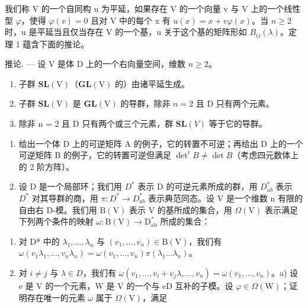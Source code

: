 我们称 V 的一个自同构 u 为平延，如果存在 V 的一个向量 v 与 V 上的一个线性型 \(\varphi\)，使得 \(\varphi(v)=0\) 且对 V 中的每个 x 有 \(u(x)=x+v\varphi(x)\)。当 \(n\geqslant2\) 时，u 是平延当且仅当存在 V 的一个基，u 关于这个基的矩阵形如 \(B_{ij}(\lambda)\)。定理 1 蕴含下面的推论。

推论. --- 设 V 是体 D 上的一个右向量空间，维数 \(n \geqslant 2\)。

\begin{enumerate}
\def\labelenumi{\alph{enumi})}
\item
  子群 \(\mathbf{SL}(\mathrm{V})\)（\(\mathbf{GL}(\mathrm{V})\) 的）由诸平延生成。
\item
  子群 \(\mathbf{SL}(\mathrm{V})\) 是 \(\mathbf{GL}(\mathrm{V})\) 的导群，除非 \(n = 2\) 且 D 只有两个元素。
\item
  除非 n = 2 且 D 只有两个或三个元素，群 \(\mathbf{SL}(V)\) 等于它的导群。
\end{enumerate}


\begin{enumerate}
\def\labelenumi{\arabic{enumi})}
\item
  给出一个体 D 上的可逆矩阵 A 的例子，它的转置不可逆；再给出 D 上的一个可逆矩阵 B 的例子，它的转置可逆但满足 \(\det^{t}B \neq \det B\)（考虑四元数体上的 2 阶方阵）。
\item
  设 D 是一个局部环；我们用 \(D^{*}\) 表示 D 的可逆元素所成的群，用 \(D_{ab}^{*}\) 表示 \(D^{*}\) 对其导群的商，用 \(\pi : D^{*} \to D_{ab}^{*}\) 表示典范同态。设 V 是一个维数 n 有限的自由右 D-模。我们用 \(\mathrm{B(V)}\) 表示 V 的基所成的集合，用 \(\Omega(\mathrm{V})\) 表示满足下列两个条件的映射 \(\omega : \mathrm{B(V)} \to \mathrm{D}_{\mathrm{ab}}^{*}\) 所成的集合：
\end{enumerate}

\begin{enumerate}
\def\labelenumi{(\roman{enumi})}
\item
  对 D* 中的 \(\lambda_1, \ldots, \lambda_n\) 与 \((v_1, \ldots, v_n) \in \mathrm{B}(\mathrm{V})\)，我们有 \(\omega(v_1 \lambda_1, \ldots, v_n \lambda_n) = \omega(v_1, \ldots, v_n)\pi(\lambda_1 \ldots \lambda_n)\)。
\item
  对 \(i \neq j\) 与 \(\lambda \in D\)，我们有 \(\omega(v_{1},\ldots,v_{i}+v_{j}\lambda,\ldots,v_{n}) = \omega(v_{1},\ldots,v_{n})\)。a) 设 e 是 V 的一个元素，W 是 V 的一个与 eD 互补的子模。设 \(\varphi \in \Omega(\mathrm{W})\)；证明存在唯一的元素 \(\omega\) 属于 \(\Omega(\mathrm{V})\)，满足
\end{enumerate}

